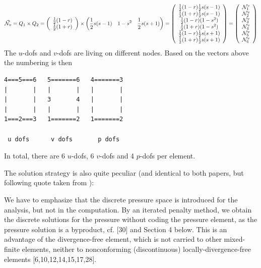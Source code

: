\[
\vec{{\mathcal{N}}}_v = Q_1 \times Q_2 = 
\left(
\begin{array}{c}
\frac12 (1-r) \\
\frac12(1+r)
\end{array}
\right)
\times
\left(
\frac12 s(s-1)  \quad
1-s^2 \quad
\frac12 s(s+1)
\right)
=
\left(
\begin{array}{c}
\frac12 (1-r) \frac12 s(s-1) \\
\frac12(1+r)  \frac12 s(s-1) \\
\frac12 (1-r) (1-s^2) \\
\frac12(1+r)  (1-s^2) \\
\frac12 (1-r) \frac12 s(s+1)\\
\frac12(1+r)  \frac12 s(s+1)
\end{array}
\right)
=
\left(
\begin{array}{c}
{\mathcal{N}}_1^v \\ 
{\mathcal{N}}_2^v \\ 
{\mathcal{N}}_3^v \\ 
{\mathcal{N}}_4^v \\ 
{\mathcal{N}}_5^v \\ 
{\mathcal{N}}_6^v 
\end{array}
\right)
\]
The $u$-dofs and $v$-dofs are living on different nodes.
Based on the vectors above the numbering is then 
\begin{verbatim}
4===5===6   5=======6   4=======3
|       |   |       |   |       |
|       |   3       4   |       |
|       |   |       |   |       |
1===2===3   1=======2   1=======2

 u dofs      v dofs       p dofs

\end{verbatim}
In total, there are 6 $u$-dofs, 6 $v$-dofs and 4 $p$-dofs per element.


The solution strategy is also quite peculiar (and identical to both papers, but 
following quote taken from \cite{huzh11}):
\begin{displayquote}
{\color{darkgray}
We have to emphasize
that the discrete pressure space is introduced for the analysis, but not in the
computation. By an iterated penalty method, we obtain the discrete solutions
for the pressure without coding the pressure element, as the pressure
solution is a byproduct, cf. [30] and Section 4 below. This is an advantage
of the divergence-free element, which is not carried to other mixed-ﬁnite
elements, neither to nonconforming (discontinuous) locally-divergence-free
elements [6,10,12,14,15,17,28].
}
\end{displayquote}

